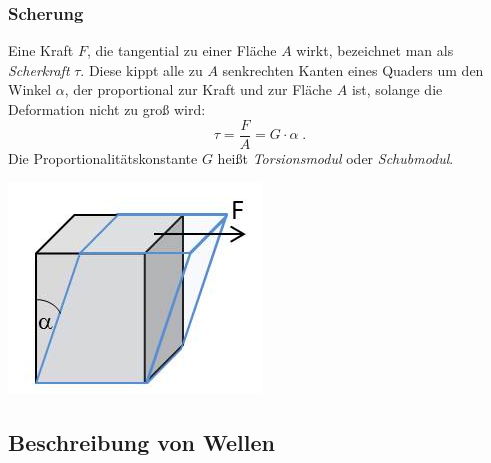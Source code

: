 \subsubsection{Scherung}

\begin{minipage}[b]{0.64\textwidth}
Eine Kraft $F$, die tangential zu einer Fläche $A$ wirkt, bezeichnet man als \textit{Scherkraft} $\tau$. Diese kippt alle zu $A$ senkrechten Kanten eines Quaders um den Winkel $\alpha$, der proportional zur Kraft und zur Fläche $A$ ist, solange die Deformation nicht zu groß wird:
\begin{equation}
	\tau = \frac{F}{A} = G\cdot \alpha\; .
\end{equation}
Die Proportionalitätskonstante $G$ heißt \textit{Torsionsmodul} oder \textit{Schubmodul}.
\end{minipage}
\hfill
\begin{minipage}[b]{0.30\textwidth}
	\includegraphics[width=.8\textwidth]{Abbildungen/Scherung.jpg}
	\label{fig:Scherung}
\end{minipage}


\subsection{Beschreibung von Wellen}

